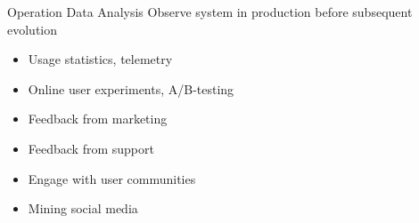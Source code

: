 \begin{Slide}{Operation Data Analysis}
Observe system in production before subsequent evolution
\begin{itemize}
\item Usage statistics, telemetry
\item Online user experiments, A/B-testing
\item Feedback from marketing
\item Feedback from support
\item Engage with user communities
\item Mining social media

\end{itemize}
\end{Slide}